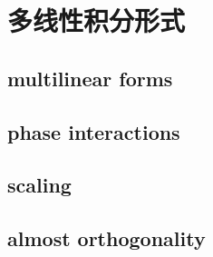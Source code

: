 \section{多线性积分形式}
\label{b2:sec:2501}


\subsection{multilinear forms}
\label{b2:subsec:250101}

\subsection{phase interactions}
\label{b2:subsec:250102}

\subsection{scaling}
\label{b2:subsec:250103}

\subsection{almost orthogonality}
\label{b2:subsec:250104}


